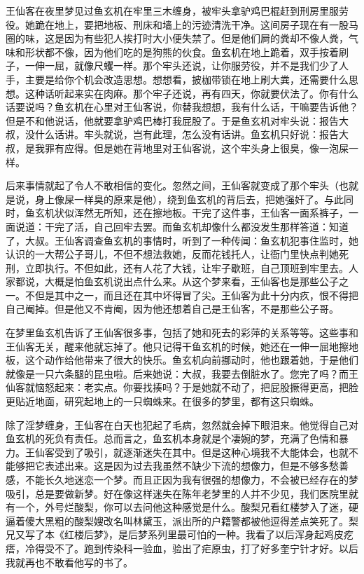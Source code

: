 王仙客在夜里梦见过鱼玄机在牢里三木缠身，被牢头拿驴鸡巴棍赶到刑房里服劳役。她跪在地上，要把地板、刑床和墙上的污迹清洗干净。这间房子现在有一股马圈的味，这是因为有些犯人挨打时大小便失禁了。但是他们屙的粪却不像人粪，气味和形状都不像，因为他们吃的是狗熊的伙食。鱼玄机在地上跪着，双手按着刷子，一伸一屈，就像尺蠼一样。那个牢头还说，让你服劳役，并不是我们少了人手，主要是给你个机会改造思想。想想看，披枷带锁在地上刷大粪，还需要什么思想。这种话听起来实在肉麻。那个牢子还说，再有四天，你就要伏法了。你有什么话要说吗？鱼玄机在心里对王仙客说，你替我想想，我有什么话，干嘛要告诉他？但是不和他说话，他就要拿驴鸡巴棒打我屁股了。于是鱼玄机对牢头说：报告大叔，没什么话讲。牢头就说，岂有此理，怎么没有话讲。鱼玄机只好说：报告大叔，是我罪有应得。但是她在背地里对王仙客说，这个牢头身上很臭，像一泡屎一样。 

后来事情就起了令人不敢相信的变化。忽然之间，王仙客就变成了那个牢头（也就是说，身上像屎一样臭的原来是他），绕到鱼玄机的背后去，把她强奸了。与此同时，鱼玄机状似浑然无所知，还在擦地板。干完了这件事，王仙客一面系裤子，一面说道：干完了活，自己回牢去罢。而鱼玄机却像什么都没发生那样答道：知道了，大叔。王仙客调查鱼玄机的事情时，听到了一种传闻：鱼玄机犯事住监时，她认识的一大帮公子哥儿，不但不想法救她，反而花钱托人，让衙门里快点判她死刑，立即执行。不但如此，还有人花了大钱，让牢子歇班，自己顶班到牢里去。人家都说，大概是怕鱼玄机说出点什么来。从这个梦来看，王仙客也是那些公子之一。不但是其中之一，而且还在其中坏得冒了尖。王仙客为此十分内疚，恨不得把自己阉掉。但是他又不肯阉，因为他还想着自己是王仙客，不是那些公子哥。 

在梦里鱼玄机告诉了王仙客很多事，包括了她和死去的彩萍的关系等等。这些事和王仙客无关，醒来他就忘掉了。他只记得干鱼玄机的时候，她还在一伸一屈地擦地板，这个动作给他带来了很大的快乐。鱼玄机向前挪动时，他也跟着她，于是他们就像是一只六条腿的昆虫啦。后来她说：大叔，我要去倒脏水了。您完了吗？而王仙客就恼怒起来：老实点。你要找揍吗？于是她就不动了，把屁股撅得更高，把脸更贴近地面，研究起地上的一只蜘蛛来。在很多的梦里，都有这只蜘蛛。 

除了淫梦缠身，王仙客在白天也犯起了毛病，忽然就会掉下眼泪来。他觉得自己对鱼玄机的死负有责任。总而言之，鱼玄机本身就是个凄婉的梦，充满了色情和暴力。王仙客受到了吸引，就逐渐迷失在其中。但是这种心境我不大能体会，也就不能够把它表述出来。这是因为过去我虽然不缺少下流的想像力，但是不够多愁善感，不能长久地迷恋一个梦。而且正因为我有很强的想像力，不会被已经存在的梦吸引，总是要做新梦。好在像这样迷失在陈年老梦里的人并不少见，我们医院里就有一个，外号烂酸梨，你可以去问他这种感觉是什么。酸梨兄看红楼梦入了迷，硬逼着傻大黑粗的酸梨嫂改名叫林黛玉，派出所的户籍警都被他逗得差点笑死了。梨兄又写了本《红楼后梦》，是后梦系列里最可怕的一种。我看了以后浑身起鸡皮疙瘩，冷得受不了。跑到传染科一验血，验出了疟原虫，打了好多奎宁针才好。以后我就再也不敢看他写的书了。 

